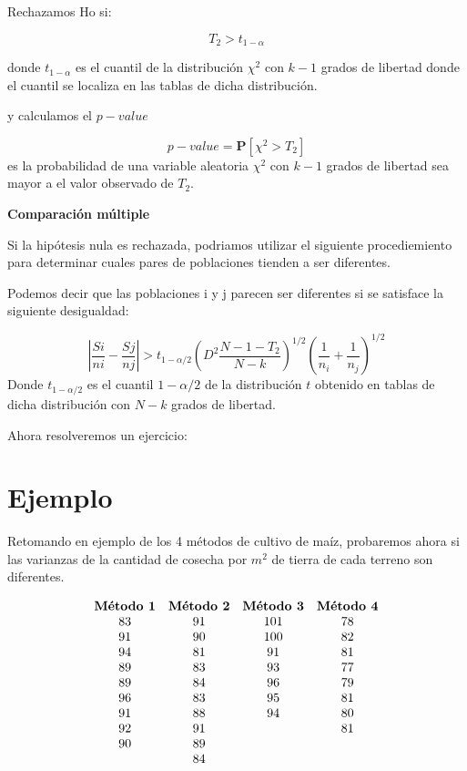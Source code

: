 \documentclass[a4paper,oneside,openany]{book}
\begin{document}
Rechazamos Ho si:

\[T_{2}>t_{1-\alpha}\]

donde \(t_{1-\alpha}\) es el cuantil de la distribución \(\chi^2\) con
\(k-1\) grados de libertad donde el cuantil se localiza en las tablas de
dicha distribución.

y calculamos el \(p-value\)

\[p-value= \mathbf{P}\left[\chi^2>T_{2}\right]\] es la probabilidad de
una variable aleatoria \(\chi^2\) con \(k-1\) grados de libertad sea
mayor a el valor observado de \(T_2\).

\textbf{Comparación múltiple}

Si la hipótesis nula es rechazada, podriamos utilizar el siguiente
procediemiento para determinar cuales pares de poblaciones tienden a ser
diferentes.

Podemos decir que las poblaciones i y j parecen ser diferentes si se
satisface la siguiente desigualdad:

\[\left|\frac{Si}{ni}- \frac{Sj}{nj}\right|> t_{1-\alpha/2}\left(D^2\frac{N-1-T_{2}}{N-k}\right)^{1/2}\left(\frac{1}{n_i}+\frac{1}{n_j}\right)^{1/2}\]
Donde \(t_{1-\alpha/2}\) es el cuantil \(1-\alpha/2\) de la distribución
\(t\) obtenido en tablas de dicha distribución con \(N-k\) grados de
libertad.

Ahora resolveremos un ejercicio:

\section{Ejemplo}\label{ejemplo-8}

Retomando en ejemplo de los 4 métodos de cultivo de maíz, probaremos
ahora si las varianzas de la cantidad de cosecha por \(m^2\) de tierra
de cada terreno son diferentes.

\[
\begin{equation*}
\begin{array}{c c c c} 
\textbf{Método 1} & \textbf{Método 2} & \textbf{Método 3} & \textbf{Método 4}\\
83&91&101&78\\
91&90&100&82\\
94&81&91&81\\
89&83&93&77\\
89&84&96&79\\
96&83&95&81\\
91&88&94&80\\
92&91&  &81\\
90&89&  &\\
  &84&  &\\
\end{array}
\end{equation*}
\]
\end{document}
